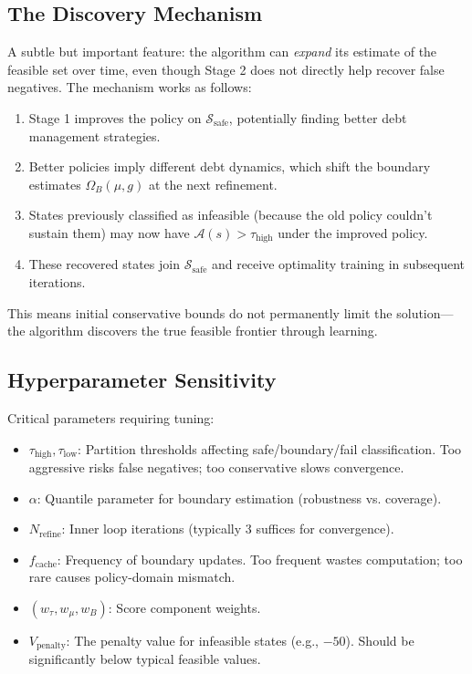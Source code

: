 \subsection{The Discovery Mechanism}
A subtle but important feature: the algorithm can \textit{expand} its estimate of the feasible set over time, even though Stage 2 does not directly help recover false negatives. The mechanism works as follows:
\begin{enumerate}
    \item Stage 1 improves the policy on $\mathcal{S}_{\text{safe}}$, potentially finding better debt management strategies.
    \item Better policies imply different debt dynamics, which shift the boundary estimates $\Omega_B(\mu, g)$ at the next refinement.
    \item States previously classified as infeasible (because the old policy couldn't sustain them) may now have $\mathcal{A}(s) > \tau_{\text{high}}$ under the improved policy.
    \item These recovered states join $\mathcal{S}_{\text{safe}}$ and receive optimality training in subsequent iterations.
\end{enumerate}
This means initial conservative bounds do not permanently limit the solution---the algorithm discovers the true feasible frontier through learning.

\subsection{Hyperparameter Sensitivity}
Critical parameters requiring tuning:
\begin{itemize}
    \item $\tau_{\text{high}}, \tau_{\text{low}}$: Partition thresholds affecting safe/boundary/fail classification. Too aggressive risks false negatives; too conservative slows convergence.
    \item $\alpha$: Quantile parameter for boundary estimation (robustness vs. coverage).
    \item $N_{\text{refine}}$: Inner loop iterations (typically 3 suffices for convergence).
    \item $f_{\text{cache}}$: Frequency of boundary updates. Too frequent wastes computation; too rare causes policy-domain mismatch.
    \item $(w_\tau, w_\mu, w_B)$: Score component weights.
    \item $V_{\text{penalty}}$: The penalty value for infeasible states (e.g., $-50$). Should be significantly below typical feasible values.
\end{itemize}

